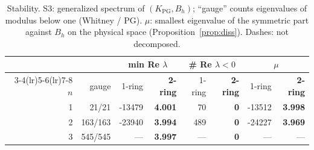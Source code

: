 \begin{table}[t]\centering\small
\caption{Stability. S3: generalized spectrum of $(K_{\mathrm{PG}},B_h)$; ``gauge'' counts eigenvalues of modulus below one (Whitney / PG). $\mu$: smallest eigenvalue of the symmetric part against $B_h$ on the physical space (Proposition~\ref{prop:diss}). Dashes: not decomposed.}
\label{tab:stability}
\begin{tabular}{rr rr rr rr}\toprule
 & & \multicolumn{2}{c}{min Re $\lambda$} & \multicolumn{2}{c}{\# Re $\lambda<0$} & \multicolumn{2}{c}{$\mu$} \\
\cmidrule(lr){3-4}\cmidrule(lr){5-6}\cmidrule(lr){7-8}
$n$ & gauge & 1-ring & \textbf{2-ring} & 1-ring & \textbf{2-ring} & 1-ring & \textbf{2-ring} \\ \midrule
1 & 21/21 & -13479 & \textbf{4.001} & 70 & \textbf{0} & -13512 & \textbf{3.998} \\
2 & 163/163 & -23940 & \textbf{3.994} & 489 & \textbf{0} & -24227 & \textbf{3.969} \\
3 & 545/545 & --- & \textbf{3.997} & --- & \textbf{0} & --- & --- \\
\bottomrule\end{tabular}\end{table}
